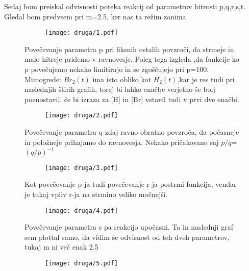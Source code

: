 \documentclass{article}
\begin{document}
Sedaj bom preiskal odvisnosti poteka reakcij od parametrov hitrosti p,q,r,s,t. Gledal bom predvsem pri m=2.5, ker nas ta režim zanima.

\begin{figure}[H]
\centering
\begin{subfigure}{\textwidth}
\texttt{[image: druga/1.pdf]}
\end{subfigure}
\caption*{Povečevanje parametra p pri fiksnih ostalih povzroči, da strmeje in malo hitreje pridemo v ravnovesje. Poleg tega izgleda ,da funkcije ko p povečujemo nekako limitirajo in se zgoščujejo pri p=100. Mimogrede: $Br_2(t)$ ima isto obliko kot $H_2(t)$,kar je res tudi pri naslednjih štirih grafih, torej bi lahko enačbe verjetno še bolj poenostavil, če bi izraza za [H] in [Br] vstavil tudi v prvi dve enačbi.}
\end{figure}

\begin{figure}[H]
\centering
\begin{subfigure}{\textwidth}
\texttt{[image: druga/2.pdf]}
\end{subfigure}
\caption*{Povečevanje parametra q zdaj ravno obratno povzroča, da počasneje in položneje prihajamo do ravnovesja. Nekako pričakovano saj $p/q$=$(q/p)^{-1}$}
\end{figure}

\begin{figure}[H]
\centering
\begin{subfigure}{\textwidth}
\texttt{[image: druga/3.pdf]}
\end{subfigure}
\caption*{Kot povečevanje p-ja tudi povečevanje r-ja postrmi funkcija, vendar je tukaj vpliv r-ja na strmino veliko močnejši.}
\end{figure}

\begin{figure}[H]
\centering
\begin{subfigure}{\textwidth}
\texttt{[image: druga/4.pdf]}
\end{subfigure}
\caption*{Povečevanje parametra s pa reakcijo upočasni. Ta in naslednji graf sem plottal samo, da vidim še odvisnost od teh dveh parametrov, tukaj m ni več enak 2.5}
\end{figure}

\begin{figure}[H]
\centering
\begin{subfigure}{\textwidth}
\texttt{[image: druga/5.pdf]}
\end{subfigure}
\end{figure}
\end{document}
